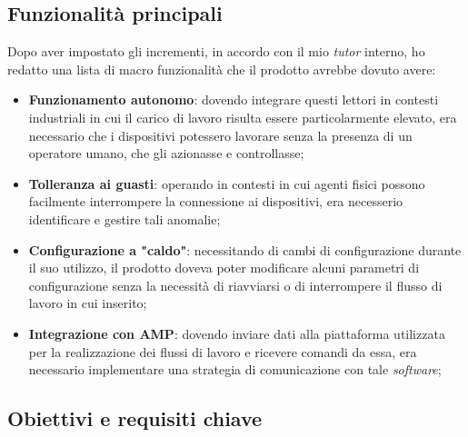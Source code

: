 \subsection{Funzionalità principali}
Dopo aver impostato gli incrementi, in accordo con il mio \emph{tutor} interno, ho redatto una lista di macro funzionalità che il prodotto avrebbe 
dovuto avere:
\begin{itemize}
    \item \textbf{Funzionamento autonomo}: dovendo integrare questi lettori in contesti industriali in cui il carico di lavoro risulta essere particolarmente 
    elevato, era necessario che i dispositivi potessero lavorare senza la presenza di un operatore umano, che gli azionasse e controllasse;
    \item \textbf{Tolleranza ai guasti}: operando in contesti in cui agenti fisici possono facilmente interrompere la connessione ai dispositivi, era necesserio
    identificare e gestire tali anomalie;
    \item \textbf{Configurazione a "caldo"}: necessitando di cambi di configurazione durante il suo utilizzo, il prodotto doveva poter modificare alcuni 
    parametri di configurazione senza la necessità di riavviarsi o di interrompere il flusso di lavoro in cui inserito;
    \item \textbf{Integrazione con AMP}: dovendo inviare dati alla  piattaforma utilizzata per la realizzazione dei flussi di lavoro e ricevere comandi da essa, 
    era necessario implementare una strategia di comunicazione con tale \emph{software};
\end{itemize}
\subsection{Obiettivi e requisiti chiave}


